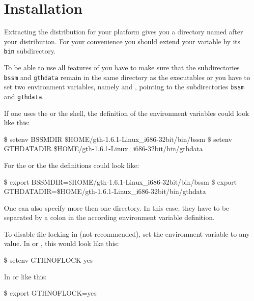 \documentclass[11pt,a4paper,titlepage]{article}
\begin{document}
\section{Installation}
\label{Installation}
Extracting the \Gth distribution for your platform gives you a directory
named after your distribution. For your convenience you should extend your  variable by its \texttt{bin} subdirectory.

To be able to use all features of \Gth you have to make sure that the
subdirectories \texttt{bssm} and \texttt{gthdata} remain in the same directory
as the executables or you have to set two environment variables, namely
 and \Environmentvariable{\gthdatadir}, pointing to
the subdirectories \texttt{bssm} and \texttt{gthdata}.

If one uses the  or the  shell,
the definition of the environment variables could look like this:

\begin{LargeOutput}
\$ setenv BSSMDIR \$HOME/gth-1.6.1-Linux\_i686-32bit/bin/bssm
\$ setenv GTHDATADIR \$HOME/gth-1.6.1-Linux\_i686-32bit/bin/gthdata
\end{LargeOutput}

For the  or the  the
definitions could look like:

\begin{LargeOutput}
\$ export BSSMDIR=\$HOME/gth-1.6.1-Linux\_i686-32bit/bin/bssm
\$ export GTHDATADIR=\$HOME/gth-1.6.1-Linux\_i686-32bit/bin/gthdata
\end{LargeOutput}

One can also specify more then one directory. In this case, they have to be separated by a colon in the according environment variable definition.

To disable file locking in \Gth (not recommended), set the environment variable
 to any value. In  or
, this would look like this:

\begin{LargeOutput}
\$ setenv GTHNOFLOCK yes
\end{LargeOutput}

In  or  like this:

\begin{LargeOutput}
\$ export GTHNOFLOCK=yes
\end{LargeOutput}
\end{document}
